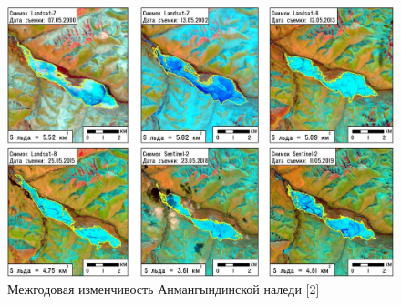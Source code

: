 \begin{figure}[h!]
  \begin{center}
    \includegraphics[width=1\textwidth]{authors/zemlaykova-1-fig-1.jpg}
  \end{center}
  \caption{Межгодовая изменчивость Анмангындинской наледи [2]}
  \label{fig:zemlaykova-1-fig-1}
\end{figure}
